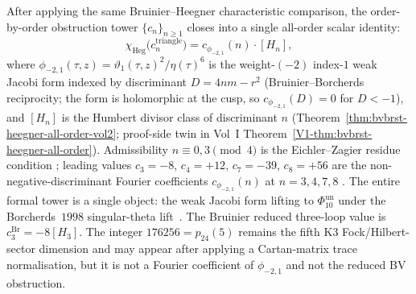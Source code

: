 \begin{remark}
\label{rem:htbb-core-heegner-pattern}
After applying the same Bruinier--Heegner characteristic comparison, the
order-by-order obstruction tower $\{c_n\}_{n\geq 1}$ closes into a
single all-order scalar identity:
\[
\chi_{\mathrm{Heg}}\bigl(c_n^{\mathrm{triangle}}\bigr)
= c_{\phi_{-2,1}}(n)\cdot [H_n],
\]
where
$\phi_{-2,1}(\tau, z) = \vartheta_1(\tau, z)^2/\eta(\tau)^6$ is the
weight-$(-2)$ index-$1$ weak Jacobi form indexed by discriminant
$D = 4nm - r^2$ (Bruinier--Borcherds reciprocity; the form is
holomorphic at the cusp, so $c_{\phi_{-2,1}}(D) = 0$ for $D < -1$),
and $[H_n]$ is the Humbert divisor class of discriminant $n$
\textup{(}Theorem~\ref{thm:bvbrst-heegner-all-order-vol2}; proof-side
twin in Vol~I
Theorem~\ref*{V1-thm:bvbrst-heegner-all-order}\textup{).} Admissibility
$n\equiv 0, 3\pmod 4$ is the Eichler--Zagier residue condition
\cite[Theorem 9.3]{EichlerZagier1985}; leading values $c_3 = -8$,
$c_4 = +12$, $c_7 = -39$, $c_8 = +56$ are the non-negative-discriminant
Fourier coefficients $c_{\phi_{-2,1}}(n)$ at $n = 3, 4, 7, 8$
\cite[Table 1]{EichlerZagier1985}. The entire formal tower is a single
object: the weak Jacobi form lifting to $\Phi_{10}^{\mathrm{un}}$ under the
Borcherds~$1998$ singular-theta
lift~\cite[Theorem 10.1]{Borcherds1998}. The Bruinier reduced
three-loop value is $c^{\mathrm{Br}}_3=-8[H_3]$. The integer
$176256=p_{24}(5)$ remains the fifth K3 Fock/Hilbert-sector dimension
and may appear after applying a Cartan-matrix trace normalisation, but
it is not a Fourier coefficient of $\phi_{-2,1}$ and not the reduced
BV obstruction.
\end{remark}
